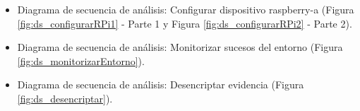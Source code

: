 \documentclass[12pt,a4paper, twoside]{report}
\begin{document}
	\begin{itemize}
		\item Diagrama de secuencia de análisis: Configurar dispositivo \gls{raspberry-a} (Figura \ref{fig:ds_configurarRPi1} - Parte 1 y Figura \ref{fig:ds_configurarRPi2} - Parte 2).
		
%		
		
		\newpage
		 
		\item Diagrama de secuencia de análisis: Monitorizar sucesos del entorno (Figura \ref{fig:ds_monitorizarEntorno}).
		

		\newpage
		
		\item Diagrama de secuencia de análisis: Desencriptar evidencia (Figura \ref{fig:ds_desencriptar}).

		

\end{itemize}
\end{document}
